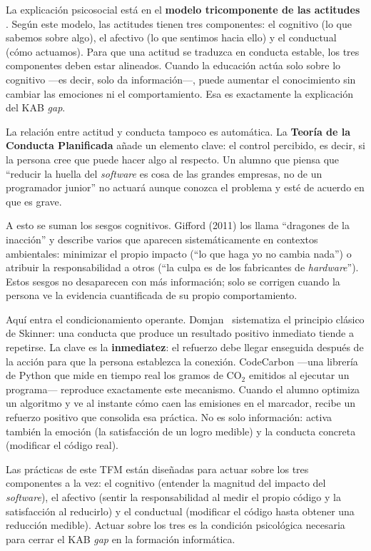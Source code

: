 La explicación psicosocial está en el \textbf{modelo tricomponente de las actitudes} \cite{rosenberg1960cognitive}. Según este modelo, las actitudes tienen tres componentes: el cognitivo (lo que sabemos sobre algo), el afectivo (lo que sentimos hacia ello) y el conductual (cómo actuamos). Para que una actitud se traduzca en conducta estable, los tres componentes deben estar alineados. Cuando la educación actúa solo sobre lo cognitivo —es decir, solo da información—, puede aumentar el conocimiento sin cambiar las emociones ni el comportamiento. Esa es exactamente la explicación del KAB \textit{gap}.


La relación entre actitud y conducta tampoco es automática. La \textbf{Teoría de la Conducta Planificada} \cite{ajzen1991theory} añade un elemento clave: el control percibido, es decir, si la persona cree que puede hacer algo al respecto. Un alumno que piensa que ``reducir la huella del \textit{software} es cosa de las grandes empresas, no de un programador junior'' no actuará aunque conozca el problema y esté de acuerdo en que es grave.


A esto se suman los sesgos cognitivos. Gifford (2011) los llama ``dragones de la inacción'' y describe varios que aparecen sistemáticamente en contextos ambientales: minimizar el propio impacto (``lo que haga yo no cambia nada'') o atribuir la responsabilidad a otros (``la culpa es de los fabricantes de \textit{hardware}''). Estos sesgos no desaparecen con más información; solo se corrigen cuando la persona ve la evidencia cuantificada de su propio comportamiento.


Aquí entra el condicionamiento operante. Domjan~\cite{domjan2018principles} sistematiza el principio clásico de Skinner: una conducta que produce un resultado positivo inmediato tiende a repetirse. La clave es la \textbf{inmediatez}: el refuerzo debe llegar enseguida después de la acción para que la persona establezca la conexión. CodeCarbon —una librería de Python que mide en tiempo real los gramos de CO$_2$ emitidos al ejecutar un programa— reproduce exactamente este mecanismo. Cuando el alumno optimiza un algoritmo y ve al instante cómo caen las emisiones en el marcador, recibe un refuerzo positivo que consolida esa práctica. No es solo información: activa también la emoción (la satisfacción de un logro medible) y la conducta concreta (modificar el código real).


Las prácticas de este TFM están diseñadas para actuar sobre los tres componentes a la vez: el cognitivo (entender la magnitud del impacto del \textit{software}), el afectivo (sentir la responsabilidad al medir el propio código y la satisfacción al reducirlo) y el conductual (modificar el código hasta obtener una reducción medible). Actuar sobre los tres es la condición psicológica necesaria para cerrar el KAB \textit{gap} en la formación informática.


